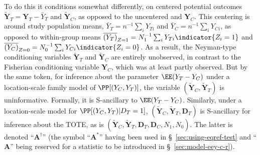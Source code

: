 To do this it conditions somewhat differently, on
centered potential outcomes
$\tilde{\mathbf{Y}}_{T} = \mathbf{Y}_{T} - \bar{Y}_{T}$ and
$\tilde{\mathbf{Y}}_C$, as opposed to the uncentered
and $\mathbf{Y}_{C}$.
This centering is around study population means,
$\bar{Y}_{T} = n^{-1}\sum_{i}Y_{Ti}$ and
$\bar{Y}_{C} = n^{-1}\sum_{i}Y_{Ci}$, as opposed to within-group means
$\overline{(Y_{T})}_{Z=1} = N_{1}^{-1}\sum_{i}
Y_{Ti}\indicator{Z_{i}=1}$
and
$\overline{(Y_{C})}_{Z=0} = N_{0}^{-1}\sum_{i}
Y_{Ci}\indicator{Z_{i}=0}$.
As a result, the Neyman-type conditioning variables $\tilde{\mathbf{Y}}_{T}$ and
$\tilde{\mathbf{Y}}_{C}$ are entirely unobserved, in contrast to the
Fisherian conditioning variable $\mathbf{Y}_{C}$, which was at least
partly observed.  But by the same token, for inference about the parameter
$\EE(Y_{T} - Y_{C})$ under a
location-scale family model of $\PP[(Y_{C}, Y_{T})]$,
the variable
$(\tilde{\mathbf{Y}}_{C}, \tilde{\mathbf{Y}}_{T})$ is uninformative.
Formally, it is S-ancillary \citep{cox2006pos,lehmannRomano2006TSH}
to $\EE(Y_{T} - Y_{C})$. Similarly,  under a location-scale model for $\PP[ (Y_{C}, Y_{T}) |
D_{T}=1]$, $(\tilde{\mathbf{Y}}_{C}, \tilde{\mathbf{Y}}_{T}, \mathbf{D}_{T})$ is S-ancillary for
inference about the TOTE, as is
$(\tilde{\mathbf{Y}}_{C},
\tilde{\mathbf{Y}}_{T}, \mathbf{D}_{T}, \mathbf{D}_{C}, N_{1},
N_{0})$.  The latter is denoted ``$\mathbf{A}^{\dagger}$'' (the symbol ``$\mathbf{A}^{*}$'' having been used in \S~\ref{sec:using-eqref-test} and ``$\mathbf{A}$'' being reserved for a statistic to be
introduced in \S~\ref{sec:model-eey-c-r}).


